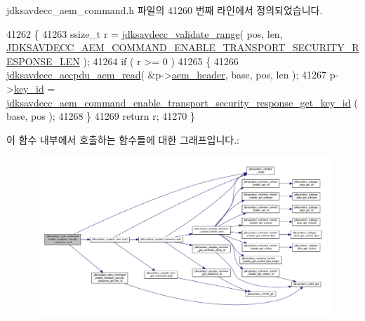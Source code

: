 jdksavdecc\+\_\+aem\+\_\+command.\+h 파일의 41260 번째 라인에서 정의되었습니다.


\begin{DoxyCode}
41262 \{
41263     ssize\_t r = \hyperlink{group__util_ga9c02bdfe76c69163647c3196db7a73a1}{jdksavdecc\_validate\_range}( pos, len, 
      \hyperlink{group__command__enable__transport__security__response_ga223c1e5ef8ff2bc723fad4c3a535cf76}{JDKSAVDECC\_AEM\_COMMAND\_ENABLE\_TRANSPORT\_SECURITY\_RESPONSE\_LEN}
       );
41264     \textcolor{keywordflow}{if} ( r >= 0 )
41265     \{
41266         \hyperlink{group__aecpdu__aem_gae2421015dcdce745b4f03832e12b4fb6}{jdksavdecc\_aecpdu\_aem\_read}( &p->\hyperlink{structjdksavdecc__aem__command__enable__transport__security__response_ae1e77ccb75ff5021ad923221eab38294}{aem\_header}, base, pos, len );
41267         p->\hyperlink{structjdksavdecc__aem__command__enable__transport__security__response_a37cbdf6056556ccfaee3ab01dc7c3032}{key\_id} = 
      \hyperlink{group__command__enable__transport__security__response_ga8778021262a7d369a63b076a21ed35dd}{jdksavdecc\_aem\_command\_enable\_transport\_security\_response\_get\_key\_id}
      ( base, pos );
41268     \}
41269     \textcolor{keywordflow}{return} r;
41270 \}
\end{DoxyCode}


이 함수 내부에서 호출하는 함수들에 대한 그래프입니다.\+:
\nopagebreak
\begin{figure}[H]
\begin{center}
\leavevmode
\includegraphics[width=350pt]{group__command__enable__transport__security__response_gacc6fefae0d59df9993215ff8de7723d1_cgraph}
\end{center}
\end{figure}


